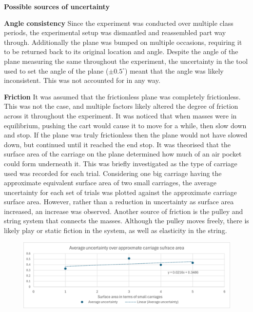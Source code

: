 \documentclass[11pt,a4paper]{article}
\begin{document}
{\large \textbf{Possible sources of uncertainty}}



\textbf{Angle consistency}\newline
Since the experiment was conducted over multiple class periods, the experimental setup was dismantled and reassembled part way through. Additionally the plane was bumped on multiple occasions, requiring it to be returned back to its original location and angle. Despite the angle of the plane measuring the same throughout the experiment, the uncertainty in the tool used to set the angle of the plane ($\pm0.5^\circ$) meant that the angle was likely inconsistent. This was not accounted for in any way.

\textbf{Friction}\newline
It was assumed that the frictionless plane was completely frictionless. This was not the case, and multiple factors likely altered the degree of friction across it throughout the experiment.
It was noticed that when masses were in equilibrium, pushing the cart would cause it to move for a while, then slow down and stop. If the plane was truly frictionless then the plane would not have slowed down, but continued until it reached the end stop. It was theorised that the surface area of the carriage on the plane determined how much of an air pocket could form underneath it. This was briefly investigated as the type of carriage used was recorded for each trial. Considering one big carriage having the approximate equivalent surface area of two small carriages, the average uncertainty for each set of trials was plotted against the approximate carriage surface area. However, rather than a reduction in uncertainty as surface area increased, an increase was observed. 
Another source of friction is the pulley and string system that connects the masses. Although the pulley moves freely, there is likely play or static fiction in the system, as well as elasticity in the string.
\begin{figure}[h]
	\centering
	\includegraphics[width=0.7\paperwidth]{./images/ApproxCarriage.png}
	
\end{figure}
\end{document}
